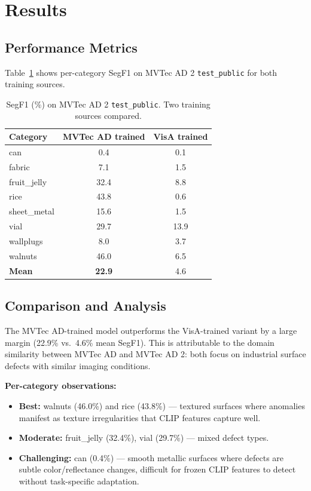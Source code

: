\documentclass[10pt,twocolumn,letterpaper]{article}
\begin{document}
\section{Results}

\subsection{Performance Metrics}

Table~\ref{tab:results} shows per-category SegF1 on MVTec AD 2 \texttt{test\_public} for both training sources.

\begin{table}[h]
\centering
\small
\caption{SegF1 (\%) on MVTec AD 2 \texttt{test\_public}. Two training sources compared.}
\label{tab:results}
\begin{tabular}{l|cc}
\hline
Category & MVTec AD trained & VisA trained \\
\hline
can & 0.4 & 0.1 \\
fabric & 7.1 & 1.5 \\
fruit\_jelly & 32.4 & 8.8 \\
rice & 43.8 & 0.6 \\
sheet\_metal & 15.6 & 1.5 \\
vial & 29.7 & 13.9 \\
wallplugs & 8.0 & 3.7 \\
walnuts & 46.0 & 6.5 \\
\hline
\textbf{Mean} & \textbf{22.9} & 4.6 \\
\hline
\end{tabular}
\end{table}

\subsection{Comparison and Analysis}

The MVTec AD-trained model outperforms the VisA-trained variant by a large margin (22.9\% vs.\ 4.6\% mean SegF1). This is attributable to the domain similarity between MVTec AD and MVTec AD 2: both focus on industrial surface defects with similar imaging conditions.

\textbf{Per-category observations:}
\begin{itemize}[nosep]
  \item \textbf{Best:} walnuts (46.0\%) and rice (43.8\%) --- textured surfaces where anomalies manifest as texture irregularities that CLIP features capture well.
  \item \textbf{Moderate:} fruit\_jelly (32.4\%), vial (29.7\%) --- mixed defect types.
  \item \textbf{Challenging:} can (0.4\%) --- smooth metallic surfaces where defects are subtle color/reflectance changes, difficult for frozen CLIP features to detect without task-specific adaptation.
\end{itemize}
\end{document}
